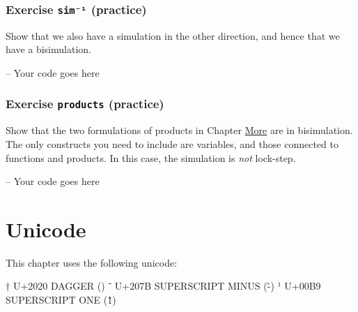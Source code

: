\hypertarget{exercise-simuxb9-practice}{%
\subsubsection{\texorpdfstring{Exercise \texttt{sim⁻¹}
(practice)}{Exercise sim⁻¹ (practice)}}\label{exercise-simuxb9-practice}}

Show that we also have a simulation in the other direction, and hence
that we have a bisimulation.

\begin{fence}
\begin{code}
-- Your code goes here
\end{code}
\end{fence}

\hypertarget{exercise-products-practice}{%
\subsubsection{\texorpdfstring{Exercise \texttt{products}
(practice)}{Exercise products (practice)}}\label{exercise-products-practice}}

Show that the two formulations of products in Chapter
\protect\hyperlink{More}{More} are in bisimulation. The only constructs
you need to include are variables, and those connected to functions and
products. In this case, the simulation is \emph{not} lock-step.

\begin{fence}
\begin{code}
-- Your code goes here
\end{code}
\end{fence}

\hypertarget{unicode}{%
\section{Unicode}\label{unicode}}

This chapter uses the following unicode:

\begin{myDisplay}
†  U+2020  DAGGER (\dag)
⁻  U+207B  SUPERSCRIPT MINUS (\^-)
¹  U+00B9  SUPERSCRIPT ONE (\^1)
\end{myDisplay}

